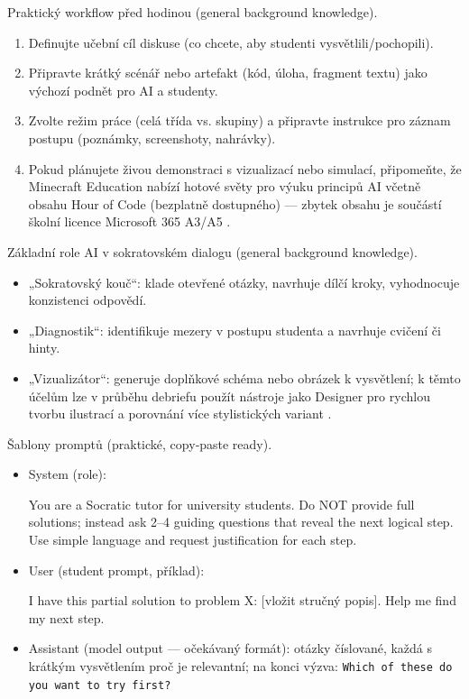 \documentclass{report}%
\begin{document}
Praktický workflow před hodinou (general background knowledge).
\begin{enumerate}
  \item Definujte učební cíl diskuse (co chcete, aby studenti vysvětlili/pochopili).
  \item Připravte krátký scénář nebo artefakt (kód, úloha, fragment textu) jako výchozí podnět pro AI a studenty.
  \item Zvolte režim práce (celá třída vs. skupiny) a připravte instrukce pro záznam postupu (poznámky, screenshoty, nahrávky).
  \item Pokud plánujete živou demonstraci s vizualizací nebo simulací, připomeňte, že Minecraft Education nabízí hotové světy pro výuku principů AI včetně obsahu Hour of Code (bezplatně dostupného) — zbytek obsahu je součástí školní licence Microsoft 365 A3/A5 \cite{kb_ai_101_tipu_pdf_04e4a115_page_15_2}. 
\end{enumerate}

Základní role AI v sokratovském dialogu (general background knowledge).
\begin{itemize}
  \item „Sokratovský kouč“: klade otevřené otázky, navrhuje dílčí kroky, vyhodnocuje konzistenci odpovědí.
  \item „Diagnostik“: identifikuje mezery v postupu studenta a navrhuje cvičení či hinty.
  \item „Vizualizátor“: generuje doplňkové schéma nebo obrázek k vysvětlení; k těmto účelům lze v průběhu debriefu použít nástroje jako Designer pro rychlou tvorbu ilustrací a porovnání více stylistických variant \cite{kb_ai_101_tipu_pdf_04e4a115_page_51_1}.
\end{itemize}

Šablony promptů (praktické, copy‑paste ready).
\begin{itemize}
  \item System (role): 
\begin{PromptBlock}


You are a Socratic tutor for university students. Do NOT provide full solutions; instead ask 2--4 guiding questions that reveal the next logical step. Use simple language and request justification for each step.
\end{PromptBlock}


  \item User (student prompt, příklad): 
\begin{PromptBlock}


I have this partial solution to problem X: [vložit stručný popis]. Help me find my next step.
\end{PromptBlock}


  \item Assistant (model output — očekávaný formát): otázky číslované, každá s krátkým vysvětlením proč je relevantní; na konci výzva: \texttt{Which of these do you want to try first?}
\end{itemize}
\end{document}
